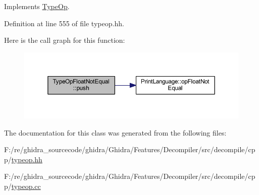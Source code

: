 Implements \mbox{\hyperlink{class_type_op_ac9c9544203ed74dabe6ac662b653b2af}{Type\+Op}}.



Definition at line 555 of file typeop.\+hh.

Here is the call graph for this function\+:
\nopagebreak
\begin{figure}[H]
\begin{center}
\leavevmode
\includegraphics[width=350pt]{class_type_op_float_not_equal_a0245e015f66e8d6101416fdb0b796dd4_cgraph}
\end{center}
\end{figure}


The documentation for this class was generated from the following files\+:\begin{DoxyCompactItemize}
\item 
F\+:/re/ghidra\+\_\+sourcecode/ghidra/\+Ghidra/\+Features/\+Decompiler/src/decompile/cpp/\mbox{\hyperlink{typeop_8hh}{typeop.\+hh}}\item 
F\+:/re/ghidra\+\_\+sourcecode/ghidra/\+Ghidra/\+Features/\+Decompiler/src/decompile/cpp/\mbox{\hyperlink{typeop_8cc}{typeop.\+cc}}\end{DoxyCompactItemize}
